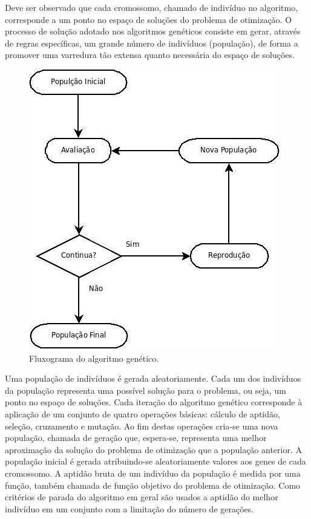 Deve ser observado que cada cromossomo, chamado de indivíduo no algoritmo, corresponde a um ponto no espaço de soluções do problema de otimização. O processo de solução adotado nos algoritmos genéticos consiste em gerar, através de regras específicas, um grande número de indivíduos (população), de forma a promover uma varredura tão extensa quanto necessária do espaço de soluções. 

\begin{figure}[htp]
	\centering
	\includegraphics[scale=0.5]{images/fluxo.jpg}
	\caption{Fluxograma do algoritmo genético.}
	\label{fig:fluxo}
\end{figure}

Uma população de  indivíduos é gerada aleatoriamente. Cada um dos indivíduos da população representa uma possível solução para o problema, ou seja, um ponto no espaço de soluções. 
Cada iteração do algoritmo genético corresponde à aplicação de um conjunto de quatro operações básicas: cálculo de aptidão, seleção, cruzamento e mutação. Ao fim destas operações cria-se uma nova população, chamada de geração que, espera-se, representa uma melhor aproximação da solução do problema de otimização que a população anterior. A população inicial é gerada atribuindo-se aleatoriamente valores aos genes de cada cromossomo. A aptidão bruta de um indivíduo da população é medida por uma função, também chamada de função objetivo do problema de otimização.
Como critérios de parada do algoritmo em geral são usados a aptidão do melhor indivíduo em um conjunto com a limitação do número de gerações. 

